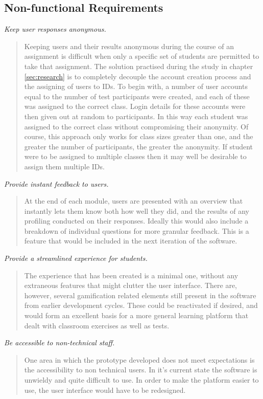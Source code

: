 \documentclass[12pt,a4paper,twoside]{report}
\begin{document}
\subsection{Non-functional Requirements}
\textit{Keep user responses anonymous.}
\begin{quote}
	Keeping users and their results anonymous during the course of an assignment is difficult when only a specific set of students are permitted to take that assignment. The solution practised during the study in chapter \ref{sec:research} is to completely decouple the account creation process and the assigning of users to IDs. To begin with, a number of user accounts equal to the number of test participants were created, and each of these was assigned to the correct class. Login details for these accounts were then given out at random to participants. In this way each student was assigned to the correct class without compromising their anonymity. Of course, this approach only works for class sizes greater than one, and the greater the number of participants, the greater the anonymity. If student were to be assigned to multiple classes then it may well be desirable to assign them multiple IDs.
\end{quote}
\textit{Provide instant feedback to users.}
\begin{quote}
	At the end of each module, users are presented with an overview that instantly lets them know both how well they did, and the results of any profiling conducted on their responses. Ideally this would also include a breakdown of individual questions for more granular feedback. This is a feature that would be included in the next iteration of the software.
\end{quote}
\textit{Provide a streamlined experience for students.}
\begin{quote}
	The experience that has been created is a minimal one, without any extraneous features that might clutter the user interface. There are, however, several gamification related elements still present in the software from earlier development cycles. These could be reactivated if desired, and would form an excellent basis for a more general learning platform that dealt with classroom exercises as well as tests.
\end{quote}
\textit{Be accessible to non-technical staff.}
\begin{quote}
	One area in which the prototype developed does not meet expectations is the accessibility to non technical users. In it's current state the software is unwieldy and quite difficult to use. In order to make the platform easier to use, the user interface would have to be redesigned.
\end{quote}
\end{document}
